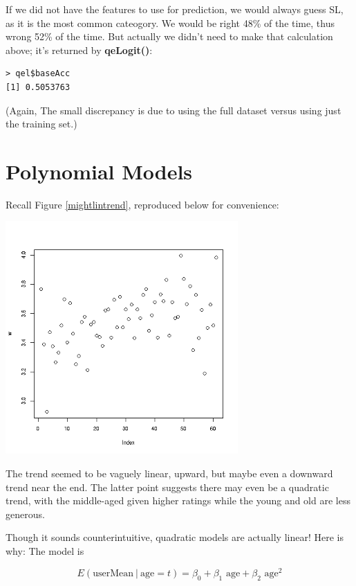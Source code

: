 If we did not have the features to use for prediction, we would always
guess SL, as it is the most common cateogory.  We would be right 48\% of
the time, thus wrong 52\% of the time.  But actually we didn't need to
make that calculation above; it's returned by \textbf{qeLogit()}:

\begin{lstlisting}
> qel$baseAcc
[1] 0.5053763
\end{lstlisting}

(Again, The small discrepancy is due to using the full dataset versus
using just the training set.)

\section{Polynomial Models}

Recall Figure \ref{mightlintrend}, reproduced below for convenience:

\includegraphics[width=3.5in]{Images/MeanRatVsAge.png}

The trend seemed to be vaguely linear, upward, but maybe even a downward
trend near the end.  The latter point suggests there may even be a
quadratic trend, with the middle-aged given higher ratings while the
young and old are less generous.

Though it sounds counterintuitive, quadratic models are actually linear!
Here is why:  The model is

\begin{equation}
\label{firstquad}
E( \textrm{userMean} ~|~ \textrm{age} = t) =
\beta_0 + \beta_1 \textrm{ age} + \beta_2 \textrm{ age}^2
\end{equation}

